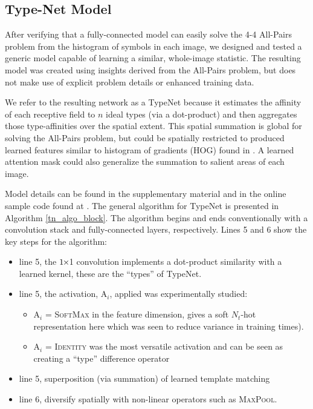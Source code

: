 \subsection{Type-Net Model} \label{typenetdetails}

After verifying that a fully-connected model can easily solve the 4-4 All-Pairs
problem from the histogram of symbols in each
image, we designed and tested a generic model capable of
learning a similar, whole-image statistic.  The resulting model was created
using insights derived from the All-Pairs problem, but does not make use of
explicit problem details or enhanced training data.

We refer to the resulting network as a TypeNet because it estimates the affinity
of each receptive field to $n$ ideal types (via a dot-product) and then
aggregates those type-affinities over the spatial extent.  This spatial
summation is global for solving the All-Pairs problem, but could
be spatially restricted to produced learned features similar to
histogram of gradients (HOG) found in \cite{mcconnell1986method}.  A learned attention mask could also generalize the summation to salient areas of each image.

Model details can be found in the supplementary material and in the online sample code found at \cite{allpairs2018}.  The general algorithm for TypeNet is presented in Algorithm \ref{tn_algo_block}.  The algorithm begins and ends conventionally with a convolution stack and fully-connected layers, respectively.  Lines 5 and 6 show the key steps for the algorithm:
\begin{itemize}
\item line 5, the $1{\mkern-1.5mu\times\mkern-1.5mu}$1 convolution implements a dot-product similarity with a learned kernel, these are the ``types'' of TypeNet.
\item line 5, the activation, \textsc{A}$_i$, applied was experimentally studied:
	\begin{itemize}
	\item \textsc{A}$_i$ = \textsc{SoftMax} in the feature dimension, gives a soft $N_t$-hot representation here which was seen to reduce variance in training times).
	\item \textsc{A}$_i$ = \textsc{Identity} was the most versatile activation and can be seen as creating a ``type'' difference operator
	\end{itemize}
\item line 5, superposition (via summation) of learned template matching
\item line 6, diversify spatially with non-linear operators such as \textsc{MaxPool}.
\end{itemize}

